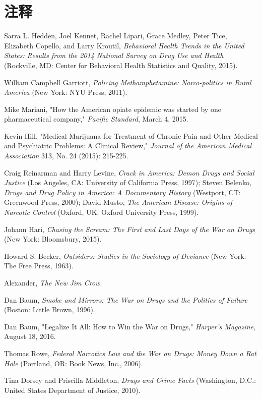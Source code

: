 \documentclass[fontset=fandol, a4paper, 12pt, openright]{ctexbook}
\begin{document}
\section*{注释}
\begin{enumerate}[label={[\arabic*]}]
    \item Sarra L. Hedden, Joel Kennet, Rachel Lipari, Grace Medley, Peter Tice, Elizabeth Copello, and Larry Kroutil, \textit{Behavioral Health Trends in the United States: Results from the 2014 National Survey on Drug Use and Health} (Rockville, MD: Center for Behavioral Health Statistics and Quality, 2015).
    \item William Campbell Garriott, \textit{Policing Methamphetamine: Narco-politics in Rural America} (New York: NYU Press, 2011).
    \item Mike Mariani, "How the American opiate epidemic was started by one pharmaceutical company," \textit{Pacific Standard}, March 4, 2015.
    \item Kevin Hill, "Medical Marijuana for Treatment of Chronic Pain and Other Medical and Psychiatric Problems: A Clinical Review," \textit{Journal of the American Medical Association} 313, No. 24 (2015): 215-225.
    \item Craig Reinarman and Harry Levine, \textit{Crack in America: Demon Drugs and Social Justice} (Los Angeles, CA: University of California Press, 1997); Steven Belenko, \textit{Drugs and Drug Policy in America: A Documentary History} (Westport, CT: Greenwood Press, 2000); David Musto, \textit{The American Disease: Origins of Narcotic Control} (Oxford, UK: Oxford University Press, 1999).
    \item Johann Hari, \textit{Chasing the Scream: The First and Last Days of the War on Drugs} (New York: Bloomsbury, 2015).
    \item Howard S. Becker, \textit{Outsiders: Studies in the Sociology of Deviance} (New York: The Free Press, 1963).
    \item Alexander, \textit{The New Jim Crow}.
    \item Dan Baum, \textit{Smoke and Mirrors: The War on Drugs and the Politics of Failure} (Boston: Little Brown, 1996).
    \item Dan Baum, "Legalize It All: How to Win the War on Drugs," \textit{Harper's Magazine}, August 18, 2016.
    \item Thomas Rowe, \textit{Federal Narcotics Law and the War on Drugs: Money Down a Rat Hole} (Portland, OR: Book News, Inc., 2006).
    \item Tina Dorsey and Priscilla Middleton, \textit{Drugs and Crime Facts} (Washington, D.C.: United States Department of Justice, 2010).

\end{enumerate}
\end{document}
